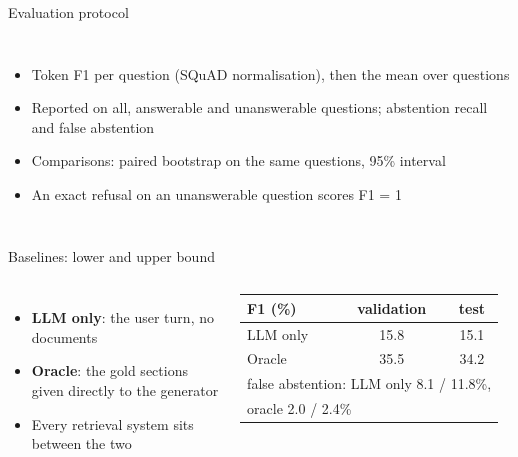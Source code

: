 \documentclass[aspectratio=169,11pt]{beamer}
\begin{document}
\begin{frame}{Evaluation protocol}
\begin{columns}[T]
\begin{itemize}
\item Token F1 per question (SQuAD normalisation), then the mean over questions
\item Reported on all, answerable and unanswerable questions; abstention recall and false abstention
\item Comparisons: paired bootstrap on the same questions, 95\% interval
\item An exact refusal on an unanswerable question scores F1 = 1
\end{itemize}
\end{columns}
\end{frame}

\begin{frame}{Baselines: lower and upper bound}
\begin{columns}[T]
\begin{itemize}
\item \textbf{LLM only}: the user turn, no documents
\item \textbf{Oracle}: the gold sections given directly to the generator
\item Every retrieval system sits between the two
\end{itemize}
\centering
\begin{tabular}{lcc}
\toprule
F1 (\%) & validation & test \\
\midrule
LLM only & 15.8 & 15.1 \\ %
Oracle & 35.5 & 34.2 \\ %
\midrule
\multicolumn{3}{l}{\footnotesize false abstention: LLM only 8.1 / 11.8\%,} \\ %
\multicolumn{3}{l}{\footnotesize oracle 2.0 / 2.4\%} \\ %
\bottomrule
\end{tabular}
\end{columns}
\end{frame}
\end{document}
